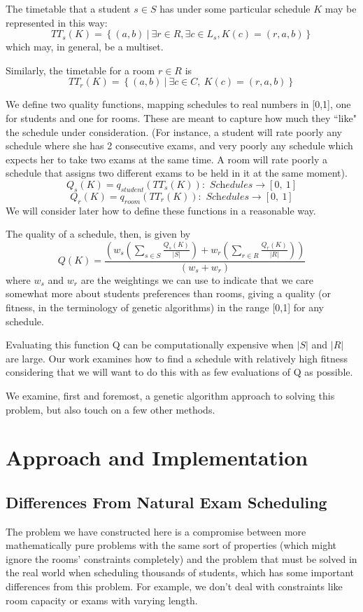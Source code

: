 \documentclass[letterpaper]{article}
\begin{document}
  The timetable that a student $s \in S$ has under some particular schedule 
  $K$ may be represented in this way:
  \[ TT_s(K) = \left\{(a, b)\ |\ \exists r \in R, \exists c \in L_s, K(c)=(r, a, b) \right\} \]
  which may, in general, be a multiset.
  
  Similarly, the timetable for a room $r \in R$ is
  \[ TT_r(K)=\left\{(a, b)\ |\ \exists c\in C,\ K(c)=(r, a, b)\right\} \]
  
  We define two quality functions, mapping schedules to real numbers in [0,1],
  one for students and one for rooms. These are meant to capture how much they
  ``like" the schedule under consideration. (For instance, a student will rate
  poorly any schedule where she has 2 consecutive exams, and very poorly any 
  schedule which expects her to take two exams at the same time. A room will 
  rate poorly a schedule that assigns two different exams to be held in it at 
  the same moment).
  \[ Q_s(K)=q_{student}\left(TT_s(K)\right):\textit{ Schedules}\rightarrow [0,\ 1] \]
  \[ Q_r(K)=q_{room}\left(TT_r(K)\right):\textit{ Schedules}\rightarrow [0,\ 1] \]
  We will consider later how to define these functions in a reasonable way.

  The quality of a schedule, then, is given by
  \[ Q(K)= \frac{\left(w_s\left(\sum_{s \in S}{\frac{Q_s(K)}{|S|}}\right) +
     w_r\left(\sum_{r\in R}{\frac{Q_r(K)}{|R|}} \right)\right)}{(w_s+w_r)} \]
  where $w_s$ and $w_r$ are the weightings we can use to indicate that we 
  care somewhat more about students preferences than rooms, giving a quality
  (or fitness, in the terminology of genetic algorithms) in the range [0,1] for
  any schedule.
  
  Evaluating this function Q can be computationally expensive when $|S|$ and $|R|$
  are large. Our work examines how to find a schedule with relatively high fitness
  considering that we will want to do this with as few evaluations of Q as possible.

  We examine, first and foremost, a genetic algorithm approach to solving this problem,
  but also touch on a few other methods.

\section{Approach and Implementation}
  \subsection{Differences From Natural Exam Scheduling}
    The problem we have constructed here is a compromise between more mathematically
    pure problems with the same sort of properties (which might ignore the rooms' 
    constraints completely) and the problem that must be solved in the real world 
    when scheduling thousands of students, which has some important differences from 
    this problem. For example, we don't deal with constraints like room capacity or 
    exams with varying length.
    
\end{document}
